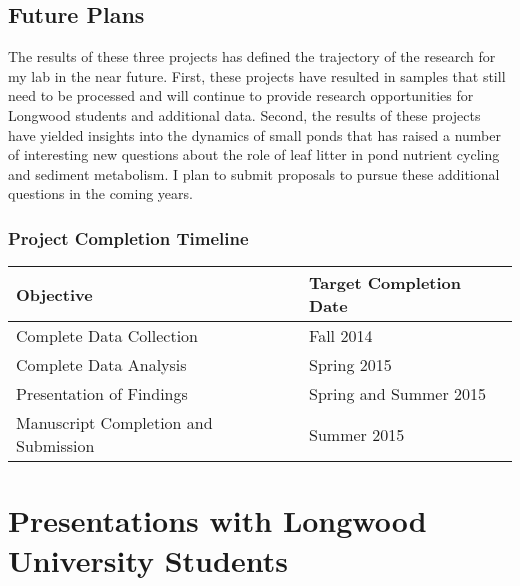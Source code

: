 \documentclass{article}
\begin{document}
\subsection{Future Plans}
The results of these three projects has defined the trajectory of the research for my lab in the near future.  First, these projects have resulted in samples that still need to be processed and will continue to provide research opportunities for Longwood students and additional data. Second, the results of these projects have yielded insights into the dynamics of small ponds that has raised a number of interesting new questions about the role of leaf litter in pond nutrient cycling and sediment metabolism. I plan to submit proposals to pursue these additional questions in the coming years.

\subsubsection{Project Completion Timeline}
\begin{tabular}{l l}
\toprule
\textbf{Objective} & \textbf{Target Completion Date} \\
\midrule
Complete Data Collection & Fall 2014 \\
Complete Data Analysis & Spring 2015 \\
Presentation of Findings & Spring and Summer 2015 \\
Manuscript Completion and Submission & Summer 2015 \\
\bottomrule
\end{tabular}

\section{Presentations with Longwood University Students}
\end{document}
